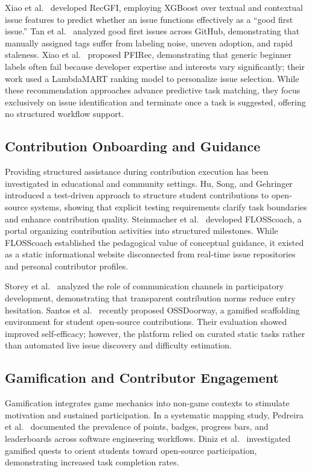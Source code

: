 \documentclass[conference]{IEEEtran}
\begin{document}
Xiao et al.~\cite{xiao2022recommending} developed RecGFI, employing XGBoost over textual and contextual issue features to predict whether an issue functions effectively as a ``good first issue.'' Tan et al.~\cite{tan2020first} analyzed good first issues across GitHub, demonstrating that manually assigned tags suffer from labeling noise, uneven adoption, and rapid staleness. Xiao et al.~\cite{xiao2023personalized} proposed PFIRec, demonstrating that generic beginner labels often fail because developer expertise and interests vary significantly; their work used a LambdaMART ranking model to personalize issue selection. While these recommendation approaches advance predictive task matching, they focus exclusively on issue identification and terminate once a task is suggested, offering no structured workflow support.

\subsection{Contribution Onboarding and Guidance}
Providing structured assistance during contribution execution has been investigated in educational and community settings. Hu, Song, and Gehringer~\cite{hu2019test} introduced a test-driven approach to structure student contributions to open-source systems, showing that explicit testing requirements clarify task boundaries and enhance contribution quality. Steinmacher et al.~\cite{steinmacher2016overcoming} developed FLOSScoach, a portal organizing contribution activities into structured milestones. While FLOSScoach established the pedagogical value of conceptual guidance, it existed as a static informational website disconnected from real-time issue repositories and personal contributor profiles.

Storey et al.~\cite{storey2017social} analyzed the role of communication channels in participatory development, demonstrating that transparent contribution norms reduce entry hesitation. Santos et al.~\cite{santos2025ossdoorway} recently proposed OSSDoorway, a gamified scaffolding environment for student open-source contributions. Their evaluation showed improved self-efficacy; however, the platform relied on curated static tasks rather than automated live issue discovery and difficulty estimation.

\subsection{Gamification and Contributor Engagement}
Gamification integrates game mechanics into non-game contexts to stimulate motivation and sustained participation. In a systematic mapping study, Pedreira et al.~\cite{pedreira2015gamification} documented the prevalence of points, badges, progress bars, and leaderboards across software engineering workflows. Diniz et al.~\cite{diniz2017using} investigated gamified quests to orient students toward open-source participation, demonstrating increased task completion rates.
\end{document}
